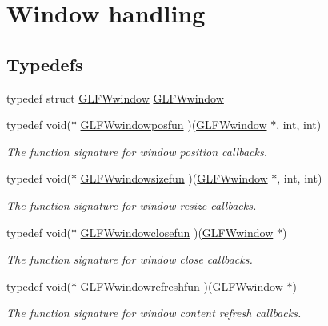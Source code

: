 \hypertarget{group__window}{\section{\-Window handling}
\label{group__window}
}
\subsection*{\-Typedefs}
\begin{DoxyCompactItemize}
\item 
typedef struct \hyperlink{group__window_ga3c96d80d363e67d13a41b5d1821f3242}{\-G\-L\-F\-Wwindow} \hyperlink{group__window_ga3c96d80d363e67d13a41b5d1821f3242}{\-G\-L\-F\-Wwindow}
\item 
typedef void($\ast$ \hyperlink{group__window_ga1c36e52549efd47790eb3f324da71924}{\-G\-L\-F\-Wwindowposfun} )(\hyperlink{group__window_ga3c96d80d363e67d13a41b5d1821f3242}{\-G\-L\-F\-Wwindow} $\ast$, int, int)
\begin{DoxyCompactList}\small\item\em \-The function signature for window position callbacks. \end{DoxyCompactList}\item 
typedef void($\ast$ \hyperlink{group__window_gaaca1c2715759d03da9834eac19323d4a}{\-G\-L\-F\-Wwindowsizefun} )(\hyperlink{group__window_ga3c96d80d363e67d13a41b5d1821f3242}{\-G\-L\-F\-Wwindow} $\ast$, int, int)
\begin{DoxyCompactList}\small\item\em \-The function signature for window resize callbacks. \end{DoxyCompactList}\item 
typedef void($\ast$ \hyperlink{group__window_ga07cff8bd3b3d573ecf49bb02d7669c1f}{\-G\-L\-F\-Wwindowclosefun} )(\hyperlink{group__window_ga3c96d80d363e67d13a41b5d1821f3242}{\-G\-L\-F\-Wwindow} $\ast$)
\begin{DoxyCompactList}\small\item\em \-The function signature for window close callbacks. \end{DoxyCompactList}\item 
typedef void($\ast$ \hyperlink{group__window_ga16764f89bf2060e6fa477f0943e1412b}{\-G\-L\-F\-Wwindowrefreshfun} )(\hyperlink{group__window_ga3c96d80d363e67d13a41b5d1821f3242}{\-G\-L\-F\-Wwindow} $\ast$)
\begin{DoxyCompactList}\small\item\em \-The function signature for window content refresh callbacks. \end{DoxyCompactList}\item 

\end{DoxyCompactItemize}
